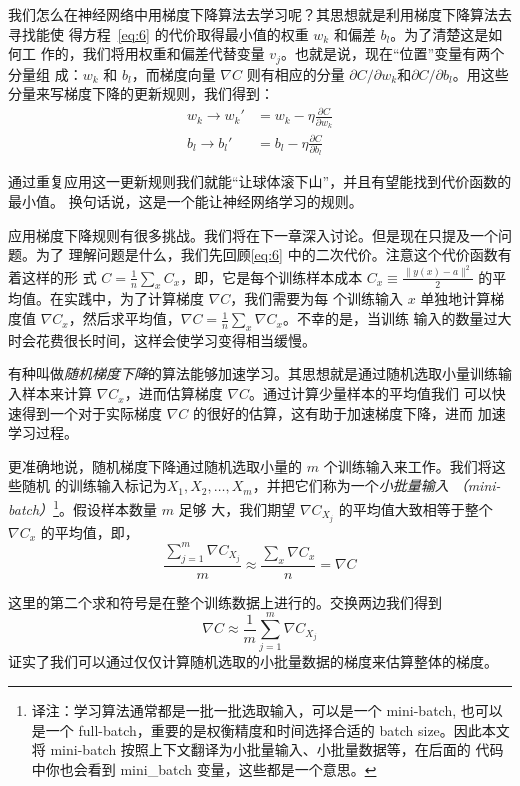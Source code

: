 我们怎么在神经网络中用梯度下降算法去学习呢？其思想就是利用梯度下降算法去寻找能使
得方程~\eqref{eq:6} 的代价取得最小值的权重 $w_k$ 和偏差 $b_l$。为了清楚这是如何工
作的，我们将用权重和偏差代替变量 $v_j$。也就是说，现在``位置''变量有两个分量组
成：$w_k$ 和 $b_l$，而梯度向量 $\nabla C$ 则有相应的分量 $\partial C / \partial
w_k$和$\partial C / \partial b_l$。用这些分量来写梯度下降的更新规则，我们得到：
\begin{align}
  \label{eq:16}w_k \rightarrow w_k' &= w_k-\eta \frac{\partial C}{\partial w_k}\tag{16}\\
  \label{eq:17}b_l \rightarrow b_l' &= b_l-\eta \frac{\partial C}{\partial b_l}\tag{17}
\end{align}

通过重复应用这一更新规则我们就能``让球体滚下山''，并且有望能找到代价函数的最小值。
换句话说，这是一个能让神经网络学习的规则。

应用梯度下降规则有很多挑战。我们将在下一章深入讨论。但是现在只提及一个问题。为了
理解问题是什么，我们先回顾\eqref{eq:6} 中的二次代价。注意这个代价函数有着这样的形
式 $C = \frac{1}{n} \sum_x C_x$，即，它是每个训练样本成本 $C_x \equiv
\frac{\|y(x)-a\|^2}{2}$ 的平均值。在实践中，为了计算梯度 $\nabla C$，我们需要为每
个训练输入 $x$ 单独地计算梯度值 $\nabla
C_x$，然后求平均值，$\nabla C = \frac{1}{n} \sum_x \nabla C_x$。不幸的是，当训练
输入的数量过大时会花费很长时间，这样会使学习变得相当缓慢。

有种叫做\emph{随机梯度下降}的算法能够加速学习。其思想就是通过随机选取小量训练输
入样本来计算 $\nabla C_x$，进而估算梯度 $\nabla C$。通过计算少量样本的平均值我们
可以快速得到一个对于实际梯度 $\nabla C$ 的很好的估算，这有助于加速梯度下降，进而
加速学习过程。

更准确地说，随机梯度下降通过随机选取小量的 $m$ 个训练输入来工作。我们将这些随机
的训练输入标记为$X_1, X_2, \ldots, X_m$，并把它们称为一个\emph{小批量输入
  （mini-batch）}\footnote{译注：学习算法通常都是一批一批选取输入，可以是一个
  mini-batch, 也可以是一个 full-batch，重要的是权衡精度和时间选择合适的 batch
  size。因此本文将 mini-batch 按照上下文翻译为小批量输入、小批量数据等，在后面的
  代码中你也会看到 mini\_batch 变量，这些都是一个意思。}。假设样本数量 $m$ 足够
大，我们期望 $\nabla C_{X_j}$ 的平均值大致相等于整个 $\nabla C_x$ 的平均值，即，
\begin{equation}
  \frac{\sum_{j=1}^m \nabla C_{X_{j}}}{m} \approx \frac{\sum_x \nabla C_x}{n} = \nabla C
  \label{eq:18}\tag{18}
\end{equation}

这里的第二个求和符号是在整个训练数据上进行的。交换两边我们得到
\begin{equation}
  \nabla C \approx \frac{1}{m} \sum_{j=1}^m \nabla C_{X_{j}}
  \label{eq:19}\tag{19}
\end{equation}
证实了我们可以通过仅仅计算随机选取的小批量数据的梯度来估算整体的梯度。

